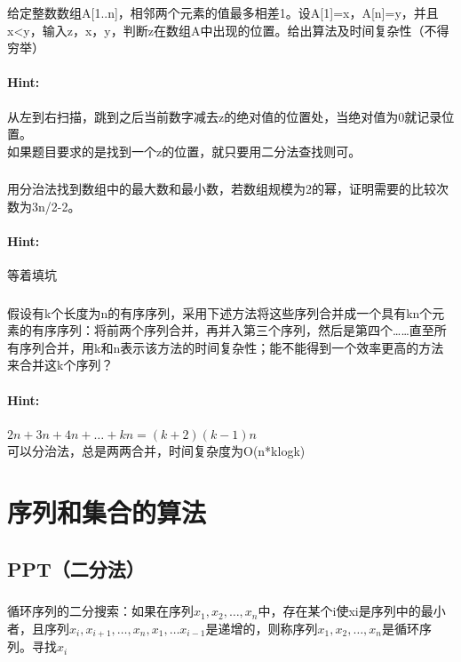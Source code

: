 \documentclass{article}
\begin{document}
     \subsubsection{}给定整数数组A[1..n]，相邻两个元素的值最多相差1。设A[1]=x，A[n]=y，并且x<y，输入z，x，y，判断z在数组A中出现的位置。给出算法及时间复杂性（不得穷举）
     \paragraph{Hint:}从左到右扫描，跳到之后当前数字减去z的绝对值的位置处，当绝对值为0就记录位置。\\
     如果题目要求的是找到一个z的位置，就只要用二分法查找则可。\\
     
     \subsubsection{}用分治法找到数组中的最大数和最小数，若数组规模为2的幂，证明需要的比较次数为3n/2-2。
     \paragraph{Hint:}等着填坑
     
     \subsubsection{}假设有k个长度为n的有序序列，采用下述方法将这些序列合并成一个具有kn个元素的有序序列：将前两个序列合并，再并入第三个序列，然后是第四个……直至所有序列合并，用k和n表示该方法的时间复杂性；能不能得到一个效率更高的方法来合并这k个序列？
     \paragraph{Hint:}$2n+3n+4n+\dots+kn =(k+2)(k-1)n$\\
    可以分治法，总是两两合并，时间复杂度为O(n*klogk)
     
     
     \section{序列和集合的算法}
     \subsection{PPT（二分法）}
     
     \subsubsection{}循环序列的二分搜索：如果在序列$x_{1},x_{2},…,x_{n}$中，存在某个i使xi是序列中的最小者，且序列$x_{i},x_{i+1},…,x_{n},x_{1},…x_{i-1}$是递增的，则称序列$x_{1},x_{2},…,x_{n}$是循环序列。寻找$x_{i}$
\end{document}
